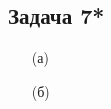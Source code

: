 \begin{comment}
	Общая формула стокса $\int_{P} d \omega = \left(-1\right)^{r} \int_{d P} \omega$\\
	Рассмотрим такую $1$-форму $\nu$ такую, что
	\begin{gather*}
	\nu = A dy \wedge dz + B dz \wedge dx + C dx \wedge dy
	\end{gather*}
	Тогда
	\begin{gather*}
	d \nu = \left\left(\frac{\partial A}{\partial x} + \frac{\partial B}{\partial y} + \frac{\partial C}{\partial z}\right\right)
	\end{gather*}
	И по формуле Стокса
	\begin{gather*}
	\int_P 0 = \int_{\partial P} \left\left(A dy \wedge dz + B dz \wedge dx + C dx \wedge dy\right\right) =\\
	\int_{\partial P} \left\left(\left\left(\frac{\partial R}{\partial y} - \frac{\partial Q}{\partial z}\right\right)dy \wedge dz + 
	\left\left(\frac{\partial P}{\partial z} - \frac{\partial R}{\partial x}\right\right)dz \wedge dx + 
	\left\left(\frac{\partial Q}{\partial x} - \frac{\partial P}{\partial y}\right\right)dx \wedge dy\right\right) =\\
	\int_{P} \left(Qdy + R dz + Pdx\right)\\
	Q dy + R dz + P dx = 0
	\end{gather*}
\end{comment}

\subsection*{Задача 7*}
\begin{enumerate}
	\item[(а)]
	\item[(б)]
\end{enumerate}
